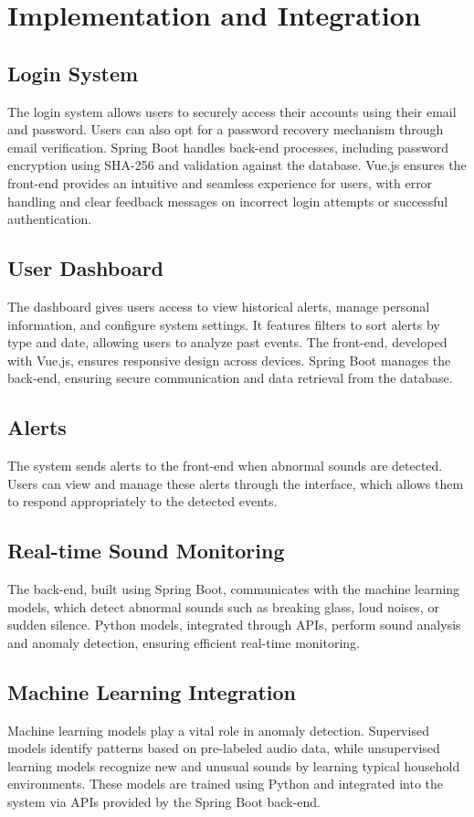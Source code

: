 \documentclass[conference]{IEEEtran}
\begin{document}
\section{Implementation and Integration}

\subsection{Login System}
The login system allows users to securely access their accounts using their email and password. Users can also opt for a password recovery mechanism through email verification. Spring Boot handles back-end processes, including password encryption using SHA-256 and validation against the database. Vue.js ensures the front-end provides an intuitive and seamless experience for users, with error handling and clear feedback messages on incorrect login attempts or successful authentication.

\subsection{User Dashboard}
The dashboard gives users access to view historical alerts, manage personal information, and configure system settings. It features filters to sort alerts by type and date, allowing users to analyze past events. The front-end, developed with Vue.js, ensures responsive design across devices. Spring Boot manages the back-end, ensuring secure communication and data retrieval from the database.

\subsection{Alerts}
The system sends alerts to the front-end when abnormal sounds are detected. Users can view and manage these alerts through the interface, which allows them to respond appropriately to the detected events.

\subsection{Real-time Sound Monitoring}
The back-end, built using Spring Boot, communicates with the machine learning models, which detect abnormal sounds such as breaking glass, loud noises, or sudden silence. Python models, integrated through APIs, perform sound analysis and anomaly detection, ensuring efficient real-time monitoring.

\subsection{Machine Learning Integration}
Machine learning models play a vital role in anomaly detection. Supervised models identify patterns based on pre-labeled audio data, while unsupervised learning models recognize new and unusual sounds by learning typical household environments. These models are trained using Python and integrated into the system via APIs provided by the Spring Boot back-end.
\end{document}
